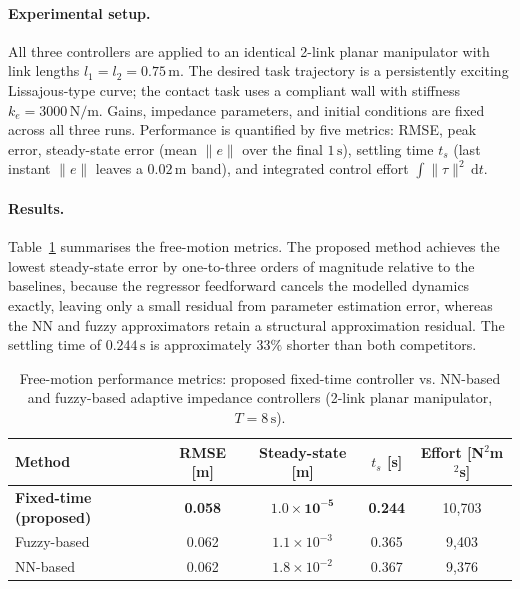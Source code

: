 {\paragraph{Experimental setup.}
All three controllers are applied to an identical 2-link planar manipulator
with link lengths $l_1=l_2=0.75\,\mathrm{m}$.
The desired task trajectory is a persistently exciting Lissajous-type curve;
the contact task uses a compliant wall with stiffness
$k_e=3000\,\mathrm{N/m}$.
Gains, impedance parameters, and initial conditions are fixed across all
three runs.
Performance is quantified by five metrics: RMSE, peak error, steady-state
error (mean $\|e\|$ over the final $1\,\mathrm{s}$), settling time $t_s$
(last instant $\|e\|$ leaves a $0.02\,\mathrm{m}$ band), and integrated
control effort $\int\|\tau\|^2\,\mathrm{d}t$.

\paragraph{Results.}
Table~\ref{tab:comp} summarises the free-motion metrics.
The proposed method achieves the lowest steady-state error by one-to-three
orders of magnitude relative to the baselines, because the regressor
feedforward cancels the modelled dynamics exactly, leaving only a small
residual from parameter estimation error, whereas the NN and fuzzy
approximators retain a structural approximation residual.
The settling time of $0.244\,\mathrm{s}$ is approximately $33\%$ shorter
than both competitors.

\begin{table}[htbp]
  \centering
  \caption{Free-motion performance metrics: proposed fixed-time controller vs.
           NN-based and fuzzy-based adaptive impedance controllers
           (2-link planar manipulator, $T=8\,\mathrm{s}$).}
  \label{tab:comp}
  \begin{tabular}{lcccc}
    \toprule
    Method & RMSE [m] & Steady-state [m] & $t_s$ [s] & Effort [N$^2$m$^2$s] \\
    \midrule
    \textbf{Fixed-time (proposed)} & \textbf{0.058} & $\mathbf{1.0\times10^{-5}}$ & \textbf{0.244} & 10{,}703 \\
    Fuzzy-based~\cite{li2014fuzzy} & 0.062 & $1.1\times10^{-3}$ & 0.365 & 9{,}403 \\
    NN-based~\cite{lewis1999neural}  & 0.062 & $1.8\times10^{-2}$ & 0.367 & 9{,}376 \\
    \bottomrule
  \end{tabular}
\end{table}

}

